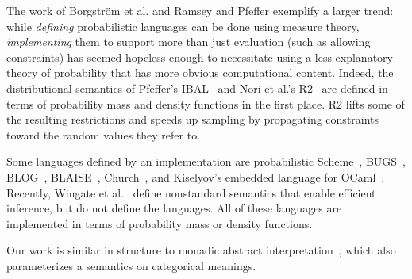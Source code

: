 \documentclass{llncs}
\begin{document}
The work of Borgstr\"om et al. and Ramsey and Pfeffer exemplify a larger trend: while \emph{defining} probabilistic languages can be done using measure theory, \emph{implementing} them to support more than just evaluation (such as allowing constraints) has seemed hopeless enough to necessitate using a less explanatory theory of probability that has more obvious computational content.
Indeed, the distributional semantics of Pfeffer's IBAL~\cite{cit:pfeffer-2007chapter-ibal} and Nori et al.'s R2~\cite{cit:nori-2014aaai-preimage} are defined in terms of probability mass and density functions in the first place.
R2 lifts some of the resulting restrictions and speeds up sampling by propagating constraints toward the random values they refer to.

\begin{comment}
Semantics       Measure-theoretic?   Conditioning?   Random World?
Kozen                   Y                  N             Y+N
DrBayes                 Y                  Y              Y
Fun Theory              Y                  Y              N
Hurd                    Y                  N              Y
Jones                   Y                  N              N
Ramsey Theory           Y                  N              N

Poole                   N                  Y              Y
McAllester              N                  Y              Y
Ramsey Impl.            N                  Y              N
Fun Impl.               N                  Y              N
IBAL                    N                  Y              N
Nori's R2               N                  Y              N
\end{comment}

Some languages defined by an implementation are probabilistic Scheme~\cite{cit:koller-1997aaai-bayes-programs-short}, BUGS~\cite{cit:winbugs-language-short}, BLOG~\cite{cit:blog-language-short}, BLAISE~\cite{cit:blaise-language}, Church~\cite{cit:church-language-short}, and Kiselyov's embedded language for OCaml~\cite{cit:kiselyov-2008uai-monolingual}.
Recently, Wingate et al.~\cite{cit:wingate-2011nips-nonstandard} define nonstandard semantics that enable efficient inference, but do not define the languages.
All of these languages are implemented in terms of probability mass or density functions.

Our work is similar in structure to monadic abstract interpretation~\cite{cit:sergey-2013pldi-monadic-abstract}, which also parameterizes a semantics on categorical meanings.
\end{document}
